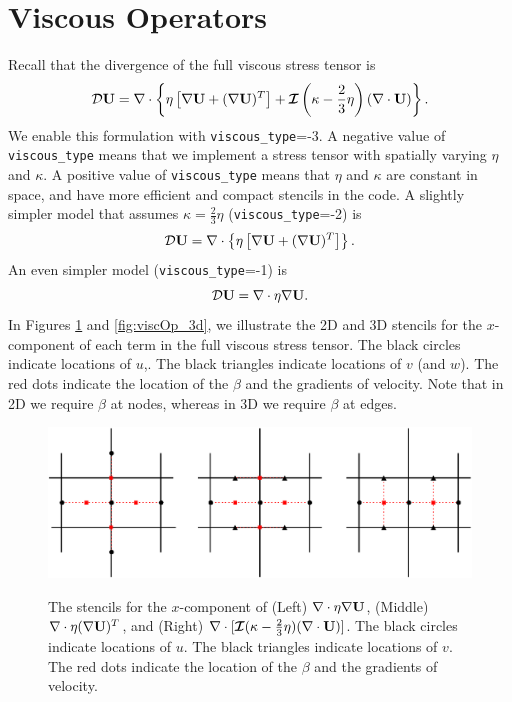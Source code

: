 \documentclass[final]{siamltex}
\def\Ub {{\bf U}}
\def\bI {\bm{\mathcal{I}}}
\begin{document}
\section{Viscous Operators}
Recall that the divergence of the full viscous stress tensor is
\begin{equation}
\mathcal{D}\Ub = \nabla\cdot\left\{\eta\left[\nabla\Ub + (\nabla\Ub)^T\right] + \bI\left(\kappa-\frac{2}{3}\eta\right)(\nabla\cdot\Ub)\right\}.
\end{equation}
We enable this formulation with {\tt viscous\_type}=-3.  A negative value of {\tt viscous\_type} means 
that we implement a stress tensor with spatially varying $\eta$ and $\kappa$.  A positive value of 
{\tt viscous\_type} means that $\eta$ and $\kappa$ are constant in space, and have more efficient
and compact stencils in the code.  A slightly simpler model that assumes $\kappa = \frac{2}{3}\eta$ 
({\tt viscous\_type}=-2) is
\begin{equation}
\mathcal{D}\Ub = \nabla\cdot\left\{\eta\left[\nabla\Ub + (\nabla\Ub)^T\right]\right\}.
\end{equation}
An even simpler model ({\tt viscous\_type}=-1) is
\begin{equation}
\mathcal{D}\Ub = \nabla\cdot\eta\nabla\Ub.
\end{equation}
In Figures \ref{fig:viscOp} and \ref{fig:viscOp_3d}, we illustrate the 2D and 3D stencils for 
the $x$-component of each term in the full viscous stress tensor.
The black circles indicate locations of $u$,.
The black triangles indicate locations of $v$ (and $w$).
The red dots indicate the location of the $\beta$ and the gradients of velocity.  
Note that in 2D we require $\beta$ at nodes, whereas in 3D we require $\beta$ at edges.
\begin{figure}[tb]
\centering
\includegraphics[width=5.25in]{viscOp}
\label{fig:viscOp}
\caption{The stencils for the $x$-component of (Left) $\nabla\cdot\eta\nabla\Ub$, (Middle) 
$\nabla\cdot\eta(\nabla\Ub)^T$, and (Right) $\nabla\cdot[\bI(\kappa-\frac{2}{3}\eta)(\nabla\cdot\Ub)]$.  
The black circles indicate locations of $u$.
The black triangles indicate locations of $v$.
The red dots indicate the location of the $\beta$ and the gradients of velocity.}
\end{figure}
\end{document}
